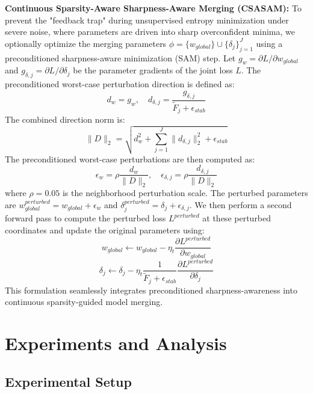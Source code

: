 \documentclass{article}
\theoremstyle{plain}
\theoremstyle{definition}
\theoremstyle{remark}
\begin{document}
\textbf{Continuous Sparsity-Aware Sharpness-Aware Merging (CSASAM):} To prevent the "feedback trap" during unsupervised entropy minimization under severe noise, where parameters are driven into sharp overconfident minima, we optionally optimize the merging parameters $\phi = \{w_{global}\} \cup \{\delta_j\}_{j=1}^J$ using a preconditioned sharpness-aware minimization (SAM) step. Let $g_w = \partial L / \partial w_{global}$ and $g_{\delta, j} = \partial L / \partial \delta_j$ be the parameter gradients of the joint loss $L$. The preconditioned worst-case perturbation direction is defined as:
\begin{equation}
    d_w = g_w, \quad d_{\delta, j} = \frac{g_{\delta, j}}{\tilde{F}_j + \epsilon_{stab}}
\end{equation}
The combined direction norm is:
\begin{equation}
    \|D\|_2 = \sqrt{d_w^2 + \sum_{j=1}^J \|d_{\delta, j}\|_2^2 + \epsilon_{stab}}
\end{equation}
The preconditioned worst-case perturbations are then computed as:
\begin{equation}
    \epsilon_w = \rho \frac{d_w}{\|D\|_2}, \quad \epsilon_{\delta, j} = \rho \frac{d_{\delta, j}}{\|D\|_2}
\end{equation}
where $\rho = 0.05$ is the neighborhood perturbation scale. The perturbed parameters are $w_{global}^{perturbed} = w_{global} + \epsilon_w$ and $\delta_j^{perturbed} = \delta_j + \epsilon_{\delta, j}$. We then perform a second forward pass to compute the perturbed loss $L^{perturbed}$ at these perturbed coordinates and update the original parameters using:
\begin{equation}
    w_{global} \leftarrow w_{global} - \eta_t \frac{\partial L^{perturbed}}{\partial w_{global}}
\end{equation}
\begin{equation}
    \delta_j \leftarrow \delta_j - \eta_t \frac{1}{\tilde{F}_j + \epsilon_{stab}} \frac{\partial L^{perturbed}}{\partial \delta_j}
\end{equation}
This formulation seamlessly integrates preconditioned sharpness-awareness into continuous sparsity-guided model merging.

\section{Experiments and Analysis}
\label{sec:experiments}

\subsection{Experimental Setup}
\end{document}
